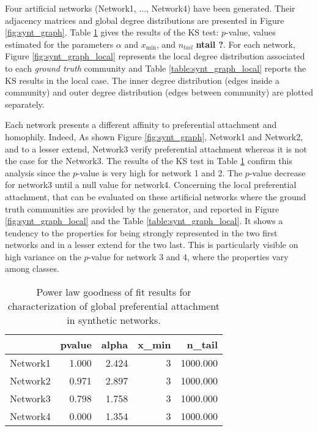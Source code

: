\documentclass[a4paper, 12pt]{article}
\begin{document}
Four artificial networks (Network1, ..., Network4) have been generated. Their adjacency matrices and global degree distributions are presented in Figure \ref{fig:synt_graph}. Table \ref{table:synt_graph} gives the results of the KS test: $p$-value, values estimated for the parameters  $\alpha$ and $x_\text{min}$,  and $n_{tail}$ \textbf{ntail ?}. For each network, Figure \ref{fig:synt_graph_local} represents the local degree distribution associated to each \emph{ground truth} community and Table \ref{table:synt_graph_local} reports the KS results in the local case. The inner degree distribution (edges inside a community) and outer degree distribution (edges between community) are plotted separately.

Each network presents a different affinity to preferential attachment and homophily.
Indeed, As shown Figure \ref{fig:synt_graph}, Network1 and Network2, and to a lesser extend, Network3 verify preferential attachment whereas it is not the case for the Network3. The results of the KS test in Table \ref{table:synt_graph} confirm this analysis since the $p$-value is very high for network 1 and 2. The $p$-value decrease for network3 until a null value for network4.
Concerning the local preferential attachment, that can be evaluated on these artificial networks where the ground truth communities are provided by the generator, and reported in Figure \ref{fig:synt_graph_local} and the Table \ref{table:synt_graph_local}. It shows a tendency to the properties for being strongly represented in the two first networks and in a lesser extend for the two last. This is particularly visible on high variance on the $p$-value for network 3 and 4, where the properties vary among classes.




\begin{table}[h]
\caption{Power law goodness of fit results for characterization of global preferential attachment in synthetic networks.}
\centering
    \begin{tabular}{lrrrr}
    \hline
               &   pvalue &   alpha &   x\_min &   n\_tail \\
    \hline
     Network1 &    1.000 &   2.424 &       3 & 1000.000 \\
     Network2 &    0.971 &   2.897 &       3 & 1000.000 \\
     Network3 &    0.798 &   1.758 &       3 & 1000.000 \\
     Network4 &    0.000 &   1.354 &       3 & 1000.000 \\
    \hline
    \end{tabular}
\label{table:synt_graph}
\end{table}
\end{document}

